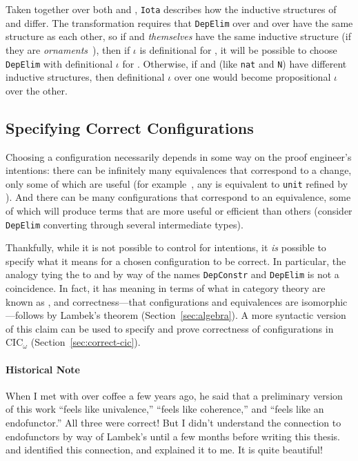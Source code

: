 Taken together over both \Aa and \B, \lstinline{Iota} describes how the inductive structures of \Aa and \B differ.
The transformation requires that \lstinline{DepElim} over \Aa and over \B have the same structure
as each other, so if \Aa and \B \textit{themselves} have the same 
inductive structure (if they are \textit{ornaments}~\cite{mcbride}),
then if $\iota$ is definitional for \Aa, it will be possible to choose
\lstinline{DepElim} with definitional $\iota$ for \B.
Otherwise, if \Aa and \B (like \lstinline{nat} and \lstinline{N}) have different inductive structures,
then definitional $\iota$ over one would become propositional $\iota$ over the other.

\subsection{Specifying Correct Configurations}
\label{sec:art}

Choosing a configuration necessarily depends in some way on the proof engineer's intentions:
there can be infinitely many equivalences that correspond to a 
change, only some of which are useful (for example~\href{https://github.com/uwplse/pumpkin-pi/blob/v2.0.0/plugin/coq/playground/refine_unit.v}{}, any \Aa is equivalent to \lstinline{unit} refined by \Aa). %
And there can be many configurations that correspond
to an equivalence, some of which will produce terms that are more useful or efficient than others
(consider \lstinline{DepElim} converting through several intermediate types).

Thankfully, while it is not possible to control for intentions,
it \textit{is} possible to specify what it means for a chosen configuration to be correct.
In particular, the analogy tying the  to  and  by way of the 
names \lstinline{DepConstr} and \lstinline{DepElim} is not a coincidence.
In fact, it has meaning in terms of what in category theory are known as ,
and correctness---that configurations and equivalences are isomorphic---follows by Lambek's 
theorem (Section~\ref{sec:algebra}).
A more syntactic version of this claim can be used to specify and prove correctness of configurations in CIC$_{\omega}$ (Section~\ref{sec:correct-cic}).

\paragraph{Historical Note}
When I met with  over coffee a few years ago, he said that a preliminary version of this work ``feels like univalence,'' ``feels like coherence,'' and ``feels like an endofunctor.'' All three were correct! But I didn't understand the connection to endofunctors by way of Lambek's until a few months before writing this thesis.
 and  identified this connection, and  explained it to me.
It is quite beautiful!

